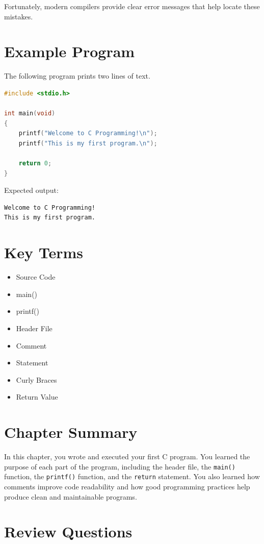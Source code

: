 \documentclass[12pt,openany]{book}
\begin{document}
Fortunately, modern compilers provide clear error messages that help locate these mistakes.

\section{Example Program}

The following program prints two lines of text.

\begin{lstlisting}[language=C]
#include <stdio.h>

int main(void)
{
    printf("Welcome to C Programming!\n");
    printf("This is my first program.\n");

    return 0;
}
\end{lstlisting}

Expected output:

\begin{lstlisting}
Welcome to C Programming!
This is my first program.
\end{lstlisting}
\section{Key Terms}

\begin{itemize}
    \item Source Code
    \item main()
    \item printf()
    \item Header File
    \item Comment
    \item Statement
    \item Curly Braces
    \item Return Value
\end{itemize}

\section{Chapter Summary}

In this chapter, you wrote and executed your first C program. You learned the purpose of each part of the program, including the header file, the \texttt{main()} function, the \texttt{printf()} function, and the \texttt{return} statement. You also learned how comments improve code readability and how good programming practices help produce clean and maintainable programs.

\section{Review Questions}
\end{document}
